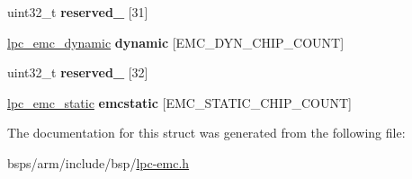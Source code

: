 \begin{DoxyCompactItemize}
\item 
\mbox{\label{structlpc__emc_a20cf1e755d8de6e759fe35b490d1a572}} 
uint32\+\_\+t {\bfseries reserved\+\_} \mbox{[}31\mbox{]}
\item 
\mbox{\label{structlpc__emc_a77b6f450a5bb2a1449e6e2f718981edd}} 
\mbox{\hyperlink{structlpc__emc__dynamic}{lpc\+\_\+emc\+\_\+dynamic}} {\bfseries dynamic} \mbox{[}E\+M\+C\+\_\+\+D\+Y\+N\+\_\+\+C\+H\+I\+P\+\_\+\+C\+O\+U\+NT\mbox{]}
\item 
\mbox{\label{structlpc__emc_aeef9e10c4d438e75d4b8b8eb6dd1a15a}} 
uint32\+\_\+t {\bfseries reserved\+\_} \mbox{[}32\mbox{]}
\item 
\mbox{\label{structlpc__emc_a0d802024f61896a31565ed524f8cf9f2}} 
\mbox{\hyperlink{structlpc__emc__static}{lpc\+\_\+emc\+\_\+static}} {\bfseries emcstatic} \mbox{[}E\+M\+C\+\_\+\+S\+T\+A\+T\+I\+C\+\_\+\+C\+H\+I\+P\+\_\+\+C\+O\+U\+NT\mbox{]}
\end{DoxyCompactItemize}


The documentation for this struct was generated from the following file\+:\begin{DoxyCompactItemize}
\item 
bsps/arm/include/bsp/\mbox{\hyperlink{lpc-emc_8h}{lpc-\/emc.\+h}}\end{DoxyCompactItemize}
